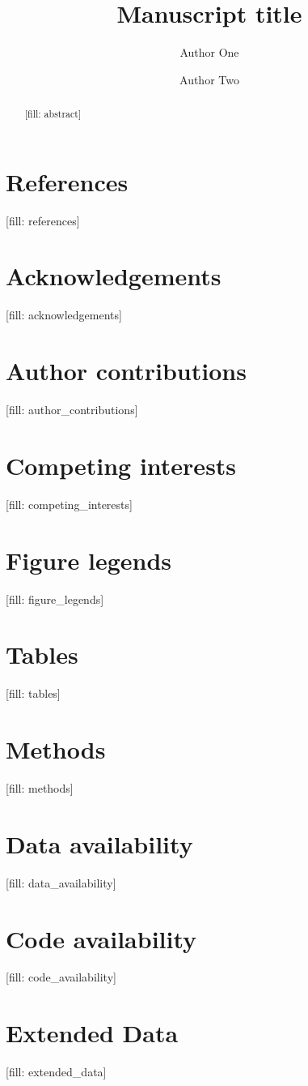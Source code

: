 \documentclass[12pt]{article}
\begin{document}
\title{Manuscript title}%
\author{Author One \and Author Two}%
\date{}
\maketitle

\begin{abstract}
[fill: abstract]
\end{abstract}

\section*{References}
[fill: references]

\section*{Acknowledgements}
[fill: acknowledgements]

\section*{Author contributions}
[fill: author_contributions]

\section*{Competing interests}
[fill: competing_interests]

\section*{Figure legends}
[fill: figure_legends]

\section*{Tables}
[fill: tables]

\section*{Methods}
[fill: methods]

\section*{Data availability}
[fill: data_availability]

\section*{Code availability}
[fill: code_availability]

\section*{Extended Data}
[fill: extended_data]
\end{document}
